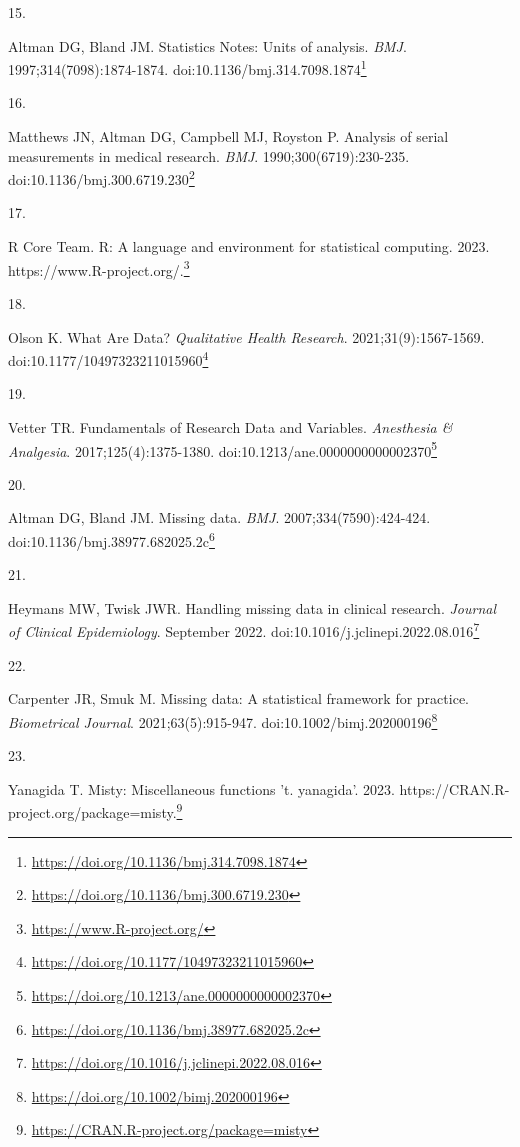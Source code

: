 \documentclass[
]{book}
\newlength{\cslhangindent}
\newlength{\csllabelwidth}
\newlength{\cslentryspacingunit} %
\newenvironment{CSLReferences}[2] %
 {%
  \setlength{\parindent}{0pt}
  \ifodd #1
  \let\oldpar\par
  \def\par{\hangindent=\cslhangindent\oldpar}
  \fi
  \setlength{\parskip}{#2\cslentryspacingunit}
 }%
 {}
\newcommand{\CSLLeftMargin}[1]{\parbox[t]{\csllabelwidth}{#1}}
\newcommand{\CSLRightInline}[1]{\parbox[t]{\linewidth - \csllabelwidth}{#1}\break}
\renewcommand{\href}[2]{#2\footnote{\url{#1}}}
\begin{document}
\begin{CSLReferences}{0}{0}
\leavevmode{}%
\CSLLeftMargin{15. }%
\CSLRightInline{Altman DG, Bland JM. Statistics Notes: Units of analysis. \emph{BMJ}. 1997;314(7098):1874-1874. doi:\href{https://doi.org/10.1136/bmj.314.7098.1874}{10.1136/bmj.314.7098.1874}}

\leavevmode{}%
\CSLLeftMargin{16. }%
\CSLRightInline{Matthews JN, Altman DG, Campbell MJ, Royston P. Analysis of serial measurements in medical research. \emph{BMJ}. 1990;300(6719):230-235. doi:\href{https://doi.org/10.1136/bmj.300.6719.230}{10.1136/bmj.300.6719.230}}

\leavevmode{}%
\CSLLeftMargin{17. }%
\CSLRightInline{R Core Team. R: A language and environment for statistical computing. 2023. \href{https://www.R-project.org/}{https://www.R-project.org/.}}

\leavevmode{}%
\CSLLeftMargin{18. }%
\CSLRightInline{Olson K. What Are Data? \emph{Qualitative Health Research}. 2021;31(9):1567-1569. doi:\href{https://doi.org/10.1177/10497323211015960}{10.1177/10497323211015960}}

\leavevmode{}%
\CSLLeftMargin{19. }%
\CSLRightInline{Vetter TR. Fundamentals of Research Data and Variables. \emph{Anesthesia \& Analgesia}. 2017;125(4):1375-1380. doi:\href{https://doi.org/10.1213/ane.0000000000002370}{10.1213/ane.0000000000002370}}

\leavevmode{}%
\CSLLeftMargin{20. }%
\CSLRightInline{Altman DG, Bland JM. Missing data. \emph{BMJ}. 2007;334(7590):424-424. doi:\href{https://doi.org/10.1136/bmj.38977.682025.2c}{10.1136/bmj.38977.682025.2c}}

\leavevmode{}%
\CSLLeftMargin{21. }%
\CSLRightInline{Heymans MW, Twisk JWR. Handling missing data in clinical research. \emph{Journal of Clinical Epidemiology}. September 2022. doi:\href{https://doi.org/10.1016/j.jclinepi.2022.08.016}{10.1016/j.jclinepi.2022.08.016}}

\leavevmode{}%
\CSLLeftMargin{22. }%
\CSLRightInline{Carpenter JR, Smuk M. Missing data: A statistical framework for practice. \emph{Biometrical Journal}. 2021;63(5):915-947. doi:\href{https://doi.org/10.1002/bimj.202000196}{10.1002/bimj.202000196}}

\leavevmode{}%
\CSLLeftMargin{23. }%
\CSLRightInline{Yanagida T. Misty: Miscellaneous functions 't. yanagida'. 2023. \href{https://CRAN.R-project.org/package=misty}{https://CRAN.R-project.org/package=misty.}}


\end{CSLReferences}
\end{document}
